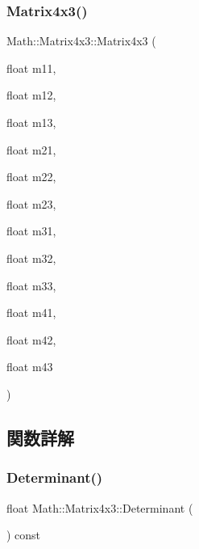 \mbox{\label{struct_math_1_1_matrix4x3_a5f512b36c9628431fda0dc0c1c4946c0}} 
\subsubsection{\texorpdfstring{Matrix4x3()}{Matrix4x3()}\hspace{0.1cm}{\footnotesize\ttfamily [4/4]}}
{\footnotesize\ttfamily Math\+::\+Matrix4x3\+::\+Matrix4x3 (\begin{DoxyParamCaption}\item[{float}]{m11,  }\item[{float}]{m12,  }\item[{float}]{m13,  }\item[{float}]{m21,  }\item[{float}]{m22,  }\item[{float}]{m23,  }\item[{float}]{m31,  }\item[{float}]{m32,  }\item[{float}]{m33,  }\item[{float}]{m41,  }\item[{float}]{m42,  }\item[{float}]{m43 }\end{DoxyParamCaption})}



\subsection{関数詳解}
\mbox{\label{struct_math_1_1_matrix4x3_af7507bc7b4ad0801c785ee45d8086063}} 
\subsubsection{\texorpdfstring{Determinant()}{Determinant()}}
{\footnotesize\ttfamily float Math\+::\+Matrix4x3\+::\+Determinant (\begin{DoxyParamCaption}{ }\end{DoxyParamCaption}) const}



